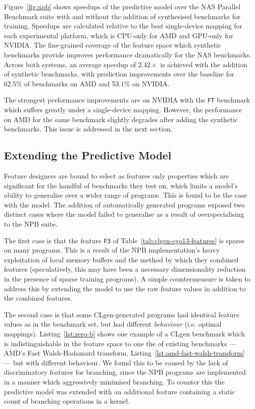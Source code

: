 Figure~\ref{fig:npb} shows speedups of the \citeauthor{Grewe2013} predictive model over the NAS Parallel Benchmark suite with and without the addition of synthesised benchmarks for training. Speedups are calculated relative to the best single-device mapping for each experimental platform, which is CPU-only for AMD and GPU-only for NVIDIA. The fine-grained coverage of the feature space which synthetic benchmarks provide improves performance dramatically for the NAS benchmarks. Across both systems, an average speedup of $2.42\times$ is achieved with the addition of synthetic benchmarks, with prediction improvements over the baseline for 62.5\% of benchmarks on AMD and 53.1\% on NVIDIA.

The strongest performance improvements are on NVIDIA with the \texttt{FT} benchmark which suffers greatly under a single-device mapping. However, the performance on AMD for the same benchmark slightly degrades after adding the synthetic benchmarks. This issue is addressed in the next section.

\subsection{Extending the Predictive Model}
\label{subsec:eval-extended}

Feature designers are bound to select as features only properties which are significant for the handful of benchmarks they test on, which limits a model's ability to generalise over a wider range of programs. This is found to be the case with the \citeauthor{Grewe2013} model. The addition of automatically generated programs exposed two distinct cases where the model failed to generalise as a result of overspecialising to the NPB suite.

The first case is that the feature \texttt{F3} of Table~\ref{tab:clgen-cgo13-features} is sparse on many programs. This is a result of the NPB implementation's heavy exploitation of local memory buffers and the method by which they combined features (speculatively, this may have been a necessary dimensionality reduction in the presence of sparse training programs). A simple countermeasure is taken to address this by extending the model to use the raw feature values in addition to the combined features.

The second case is that some CLgen-generated programs had identical feature values as in the benchmark set, but had different \emph{behaviour} (i.e. optimal mappings). Listing~\ref{lst:zero-b} shows one example of a CLgen benchmark which is indistinguishable in the feature space to one the of existing benchmarks --- AMD's Fast Walsh-Hadamard transform, Listing~\ref{lst:amd-fast-walsh-transform} --- but with different behaviour. We found this to be caused by the lack of discriminatory features for branching, since the NPB programs are implemented in a manner which aggressively minimised branching. To counter this the predictive model was extended with an additional feature containing a static count of branching operations in a kernel.

